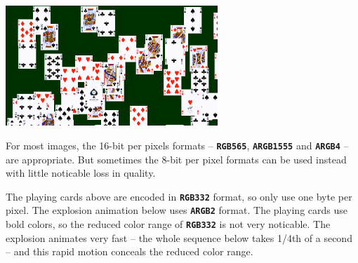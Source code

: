 \documentclass[10pt]{book}
\newcommand{\mach}[1]{\texttt{\textbf{#1}}}
\begin{document}
\begin{CJK}{UTF8}{gkai}
\begin{center}
\includegraphics[width=0.6\textwidth]{assets/0034.png}
\end{center}

For most images, the 16-bit per pixels formats --
\mach{RGB565},
\mach{ARGB1555} and
\mach{ARGB4} -- 
are appropriate. But sometimes the 8-bit per pixel formats can be used instead with little noticable loss in quality.

The playing cards above are encoded in
\mach{RGB332} format, so only use one byte per pixel. The explosion animation below uses
\mach{ARGB2} format.
The playing cards use bold colors, so the reduced color range of \mach{RGB332} is not very noticable.
The explosion animates very fast -- the whole sequence below takes 1/4th of a second --
and this rapid motion conceals the reduced color range.


\end{CJK}
\end{document}
